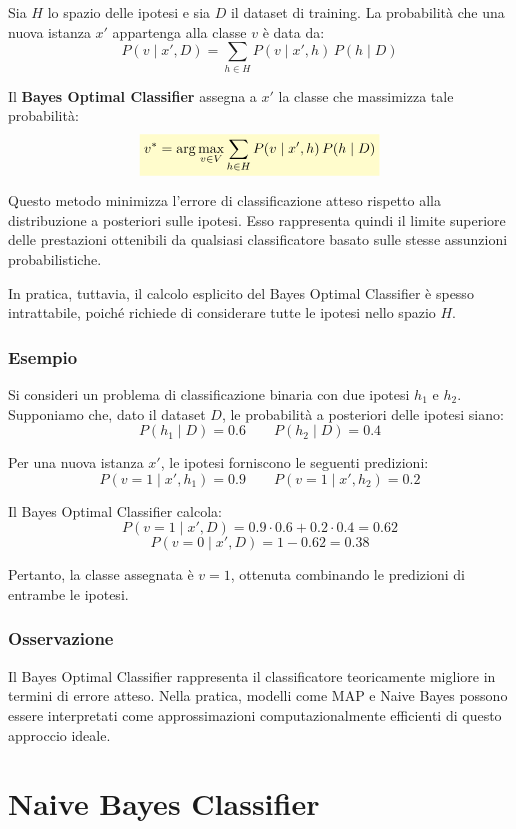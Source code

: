 \documentclass[a4paper,12pt]{report}
\newcommand{\highlight}[1]{%
\colorbox{yellow!20}{$\displaystyle #1$}%
}
\begin{document}
Sia \( H \) lo spazio delle ipotesi e sia \( D \) il dataset di training.
La probabilità che una nuova istanza \( x' \) appartenga alla classe \( v \) è data da:
\[
P(v \mid x', D) = \sum_{h \in H} P(v \mid x', h)\, P(h \mid D)
\]

Il \textbf{Bayes Optimal Classifier} assegna a \( x' \) la classe che massimizza tale probabilità:
\[
\highlight{
v^* = \arg\max_{v \in V} \sum_{h \in H} P(v \mid x', h)\, P(h \mid D)}
\]

Questo metodo minimizza l’errore di classificazione atteso rispetto alla distribuzione a posteriori sulle ipotesi.
Esso rappresenta quindi il limite superiore delle prestazioni ottenibili da qualsiasi classificatore basato sulle stesse assunzioni probabilistiche.

In pratica, tuttavia, il calcolo esplicito del Bayes Optimal Classifier è spesso intrattabile, poiché richiede di considerare tutte le ipotesi nello spazio \( H \).

\subsubsection*{Esempio}

Si consideri un problema di classificazione binaria con due ipotesi \( h_1 \) e \( h_2 \).
Supponiamo che, dato il dataset \( D \), le probabilità a posteriori delle ipotesi siano:
\[
P(h_1 \mid D) = 0.6 \qquad P(h_2 \mid D) = 0.4
\]

Per una nuova istanza \( x' \), le ipotesi forniscono le seguenti predizioni:
\[
P(v=1 \mid x', h_1) = 0.9 \qquad P(v=1 \mid x', h_2) = 0.2
\]

Il Bayes Optimal Classifier calcola:
\[
P(v=1 \mid x', D) = 0.9 \cdot 0.6 + 0.2 \cdot 0.4 = 0.62
\]
\[
P(v=0 \mid x', D) = 1 - 0.62 = 0.38
\]

Pertanto, la classe assegnata è \( v = 1 \), ottenuta combinando le predizioni di entrambe le ipotesi.

\subsubsection*{Osservazione}

Il Bayes Optimal Classifier rappresenta il classificatore teoricamente migliore in termini di errore atteso.
Nella pratica, modelli come MAP e Naive Bayes possono essere interpretati come approssimazioni computazionalmente efficienti di questo approccio ideale.

\section{Naive Bayes Classifier}
\end{document}
